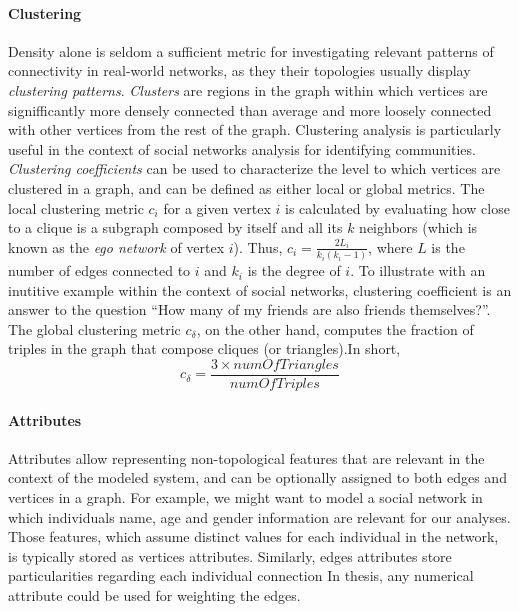 \paragraph*{Clustering}
Density alone is seldom a sufficient metric for investigating relevant patterns of connectivity in real-world networks, as they their topologies usually display \textit{clustering patterns}.
\textit{Clusters} are regions in the graph within which vertices are signifficantly more densely connected than average and more loosely connected with other vertices from the rest of the graph. 
Clustering analysis is particularly useful in the context of social networks analysis for identifying communities.
%
\textit{Clustering coefficients} can be used to characterize the level to which vertices are clustered in a graph, and can be defined as either local or global metrics.
The local clustering metric $c_i$ for a given vertex $i$ is calculated by evaluating how close to a clique is a subgraph composed by itself and all its $k$ neighbors (which is known as the \textit{ego network} of vertex $i$). Thus, $c_i = \frac{2L_i}{k_i(k_i - 1)}$, where $L$ is the number of edges connected to $i$ and $k_i$ is the degree of $i$.
To illustrate with an inutitive example within the context of social networks, clustering coefficient is an answer to the question ``How many of my friends are also friends themselves?''.
%
The global clustering metric $c_{\delta}$, on the other hand, computes the fraction of triples in the graph that compose cliques (or triangles).In short, \begin{equation}\label{eq:globalclustering}
c_{\delta} = \frac{3 \times numOfTriangles}{numOfTriples}
\end{equation}

\paragraph*{Attributes}
Attributes allow representing non-topological features that are relevant in the context of the modeled system, and can be optionally assigned to both edges and vertices in a graph.
For example, we might want to model a social network in which individuals name, age and gender information are relevant for our analyses.
Those features, which assume distinct values for each individual in the network, is typically stored as vertices attributes.
Similarly, edges attributes store particularities regarding each individual connection
In thesis, any numerical attribute could be used for weighting the edges.

